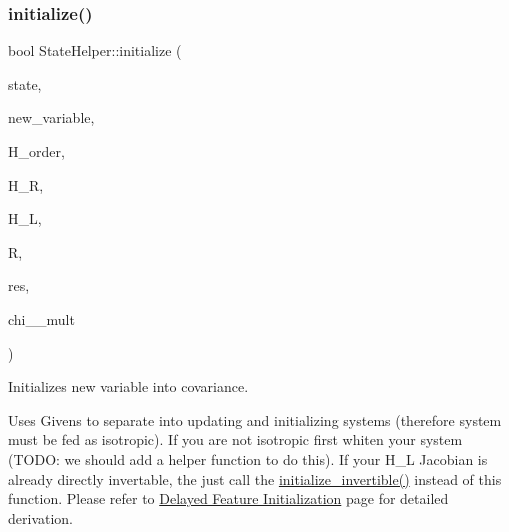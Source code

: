 \subsubsection{\texorpdfstring{initialize()}{initialize()}}
{\footnotesize\ttfamily bool State\+Helper\+::initialize (\begin{DoxyParamCaption}\item[{std\+::shared\+\_\+ptr$<$ \hyperlink{classov__msckf_1_1State}{State} $>$}]{state,  }\item[{std\+::shared\+\_\+ptr$<$ \hyperlink{classov__type_1_1Type}{ov\+\_\+type\+::\+Type} $>$}]{new\+\_\+variable,  }\item[{const std\+::vector$<$ std\+::shared\+\_\+ptr$<$ \hyperlink{classov__type_1_1Type}{ov\+\_\+type\+::\+Type} $>$$>$ \&}]{H\+\_\+order,  }\item[{Eigen\+::\+Matrix\+Xd \&}]{H\+\_\+R,  }\item[{Eigen\+::\+Matrix\+Xd \&}]{H\+\_\+L,  }\item[{Eigen\+::\+Matrix\+Xd \&}]{R,  }\item[{Eigen\+::\+Vector\+Xd \&}]{res,  }\item[{double}]{chi\+\_\+\_\+mult }\end{DoxyParamCaption})\hspace{0.3cm}{\ttfamily [static]}}



Initializes new variable into covariance. 

Uses Givens to separate into updating and initializing systems (therefore system must be fed as isotropic). If you are not isotropic first whiten your system (T\+O\+DO\+: we should add a helper function to do this). If your H\+\_\+L Jacobian is already directly invertable, the just call the \hyperlink{classov__msckf_1_1StateHelper_adb0f34932bb91d89bfd5ae72c2e693d8}{initialize\+\_\+invertible()} instead of this function. Please refer to \hyperlink{update-delay}{Delayed Feature Initialization} page for detailed derivation.


